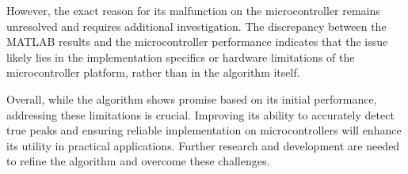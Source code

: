However, the exact reason for its malfunction on the microcontroller remains unresolved and requires additional investigation. The discrepancy between the MATLAB results and the microcontroller performance indicates that the issue likely lies in the implementation specifics or hardware limitations of the microcontroller platform, rather than in the algorithm itself.

Overall, while the algorithm shows promise based on its initial performance, addressing these limitations is crucial. Improving its ability to accurately detect true peaks and ensuring reliable implementation on microcontrollers will enhance its utility in practical applications. Further research and development are needed to refine the algorithm and overcome these challenges.